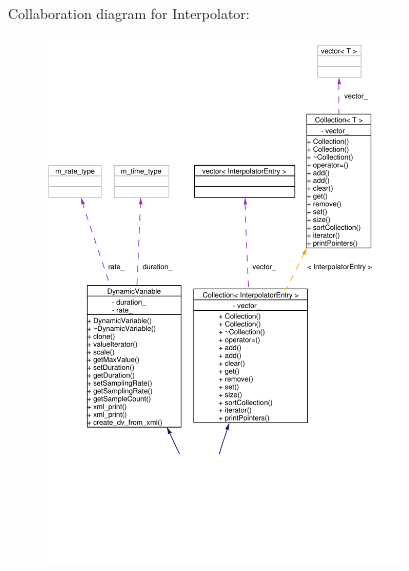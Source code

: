 Collaboration diagram for Interpolator:\begin{figure}[H]
\begin{center}
\leavevmode
\includegraphics[width=265pt]{classInterpolator__coll__graph}
\end{center}
\end{figure}
